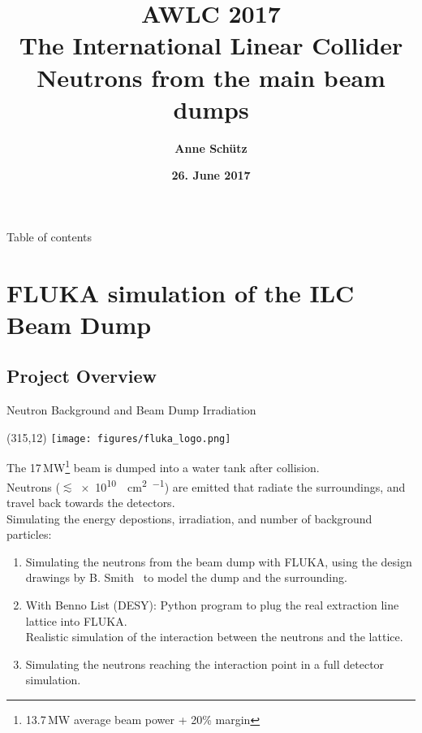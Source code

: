 \documentclass[xcolor={dvipsnames}]{beamer}
\title[Neutrons from the main beam dumps]{\textbf{\alert{AWLC 2017} \\ \vspace*{0.3cm} The International Linear Collider \\ \LARGE Neutrons from the main beam dumps}}
\author{\textbf{Anne Sch\"utz}}
\institute{\textbf{DESY}}
\date{\textbf{26. June 2017}}
\newcommand{\flukalogo}{
  \setlength{\TPHorizModule}{1pt}
  \setlength{\TPVertModule}{1pt}
  \begin{textblock}{1}(315,12)
   \texttt{[image: figures/fluka\_logo.png]}
  \end{textblock}
}
\begin{document}
{
\begin{frame}
  \titlepage
\end{frame}
}

\begin{frame}{Table of contents}
  \tableofcontents
\end{frame}



\section{FLUKA simulation of the ILC Beam Dump}
\subsection{Project Overview}
{
\begin{frame}{Neutron Background and Beam Dump Irradiation}
\flukalogo
The 17\,MW\footnote{13.7\,MW average beam power + 20\% margin} beam is dumped into a water tank after collision.\\Neutrons ($\lesssim$\SI{e10}{\per\square\centi\metre\per\year}) are emitted that radiate the surroundings, and travel back towards the detectors.\\
\vspace*{0.1cm}
\alert{Simulating the energy depostions, irradiation, and number of background particles:}
\begin{enumerate}
 \item Simulating the neutrons from the beam dump with FLUKA, using the design drawings by B. Smith~\cite{Smith} to model the dump and the surrounding.
 \item With Benno List (DESY): Python program to plug the real extraction line lattice into FLUKA.\\
Realistic simulation of the interaction between the neutrons and the lattice.
 \item Simulating the neutrons reaching the interaction point in a full detector simulation.
\end{enumerate}
\end{frame}
}

\end{document}
